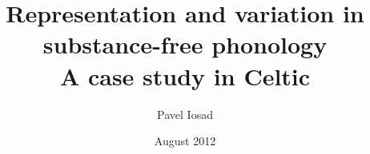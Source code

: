 \author{Pavel Iosad}
\title{Representation and variation in substance-free phonology\\{\Large A case study in Celtic}}
\date{August 2012}
\renewcommand\maketitlehookc{\vfill\begin{center}
    A dissertation submitted for the degree of Philosophiæ Doctor\\[3\baselineskip]University of Tromsø\\Center for Advanced Study in Theoretical Linguistics\vfill\texttt{[image: graphics/logo]}\vfill\end{center}}
\begin{titlingpage}
  \maketitle
\end{titlingpage}
